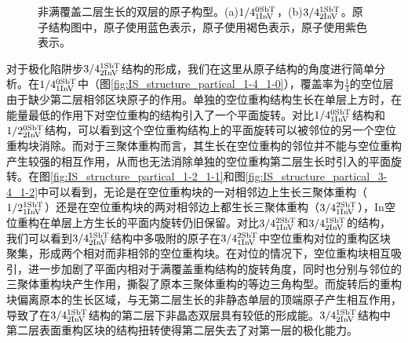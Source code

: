\begin{figure}[htb]
{        \label{fig:IS_structure_partical_3-4_1-2}
    }
    \caption{非满覆盖二层生长的双层的原子构型。(a)$\rm 1/4{}_{1InV}^{0SbT} \it$，(b)$\rm 3/4{}_{2InV}^{1SbT} \it$。原子结构图中，原子使用蓝色表示，原子使用褐色表示，原子使用紫色表示。}
    \label{fig:IS_structure_partical_2}
\end{figure}

对于极化陷阱步$\rm 3/4{}_{2InV}^{1SbT} \it$结构的形成，我们在这里从原子结构的角度进行简单分析。在$\rm 1/4{}_{1InV}^{0SbT} \it$中（图\ref{fig:IS_structure_partical_1-4_1-0}），覆盖率为$\frac{1}{4}$的空位层由于缺少第二层相邻区块原子的作用。单独的空位重构结构生长在单层上方时，在能量最低的作用下对空位重构的结构引入了一个平面旋转。对比$\rm 1/4{}_{1InV}^{0SbT} \it$结构和$\rm 1/2{}_{2InV}^{0SbT} \it$结构，可以看到这个空位重构结构上的平面旋转可以被邻位的另一个空位重构块消除。而对于三聚体重构而言，其生长在空位重构的邻位并不能与空位重构产生较强的相互作用，从而也无法消除单独的空位重构第二层生长时引入的平面旋转。在图\ref{fig:IS_structure_partical_1-2_1-1}和图\ref{fig:IS_structure_partical_3-4_1-2}中可以看到，无论是在空位重构块的一对相邻边上生长三聚体重构（$\rm 1/2{}_{1InV}^{1SbT} \it$）还是在空位重构块的两对相邻边上都生长三聚体重构（$\rm 3/4{}_{1InV}^{2SbT} \it$），{In}空位重构在单层上方生长的平面内旋转仍旧保留。对比$\rm 3/4{}_{1InV}^{2SbT} \it$和$\rm 3/4{}_{2InV}^{1SbT} \it$的结构，我们可以看到$\rm 3/4{}_{2InV}^{1SbT} \it$结构中多吸附的原子在$\rm 3/4{}_{1InV}^{2SbT} \it$中空位重构对位的重构区块聚集，形成两个相对而非相邻的空位重构块。在对位的情况下，空位重构块相互吸引，进一步加剧了平面内相对于满覆盖重构结构的旋转角度，同时也分别与邻位的三聚体重构块产生作用，撕裂了原本三聚体重构的等边三角构型。而旋转后的重构块偏离原本的生长区域，与无第二层生长的非静态单层的顶端原子产生相互作用，导致了在$\rm 3/4{}_{2InV}^{1SbT} \it$结构的第二层下非晶态双层具有较低的形成能。$\rm 3/4{}_{2InV}^{1SbT} \it$结构中第二层表面重构区块的结构扭转使得第二层失去了对第一层的极化能力。

